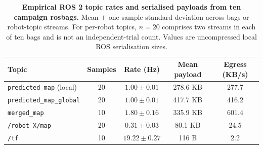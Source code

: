 \documentclass[11pt]{article}
\newcommand{\TableSetup}{%
  \footnotesize
  \setlength{\tabcolsep}{3pt}%
  \renewcommand{\arraystretch}{1.08}%
}
\begin{document}
\begin{table}[H]
  \centering
  \caption{\textbf{Empirical ROS 2 topic rates and serialised payloads from ten campaign rosbags.} Mean $\pm$ one sample standard deviation across bags or robot-topic streams. For per-robot topics, $n=20$ comprises two streams in each of ten bags and is not an independent-trial count. Values are uncompressed local ROS serialisation sizes.}
  \TableSetup
  \begin{tabular*}{\textwidth}{@{\extracolsep{\fill}}lcccc@{}}
    \toprule
    \rowcolor{TableHeader}
    \textbf{Topic} & \textbf{Samples} & \textbf{Rate (Hz)} & \textbf{Mean payload} & \textbf{Egress (KB/s)} \\
    \midrule
    \texttt{predicted\_map} (local) & 20 & $1.00\pm0.01$ & 278.6 KB & 277.7 \\
    \texttt{predicted\_map\_global} & 20 & $1.00\pm0.01$ & 417.7 KB & 416.2 \\
    \texttt{merged\_map} & 10 & $1.80\pm0.16$ & 335.9 KB & 601.4 \\
    \texttt{/robot\_X/map} & 20 & $0.31\pm0.03$ & 80.1 KB & 24.5 \\
    \texttt{/tf} & 10 & $19.22\pm0.27$ & 116 B & 2.2 \\
    \bottomrule
  \end{tabular*}
\end{table}
\end{document}
